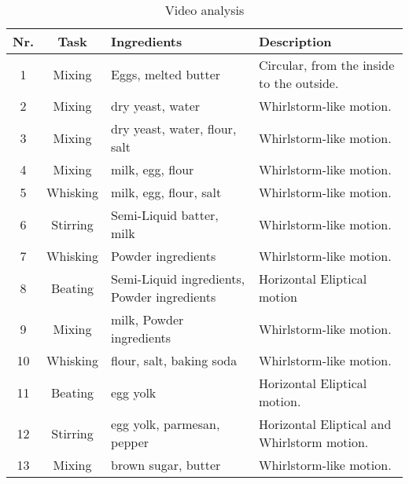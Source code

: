 \begin{table}[H]
    \centering
    \begin{tabular}{|c|c|p{}|p{}|}
        \hline
        \textbf{Nr.} & \textbf{Task} &  \textbf{Ingredients} & \textbf{Description} \\
        \hline
        1 & Mixing &  Eggs, melted butter & Circular, from the inside to the outside. \\
        \hline
        2 & Mixing &  dry yeast, water & Whirlstorm-like motion.\\
        \hline
        3 & Mixing &  dry yeast, water, flour, salt & Whirlstorm-like motion.\\
        \hline
        4 & Mixing &  milk, egg, flour & Whirlstorm-like motion.\\
        \hline
        5 & Whisking & milk, egg, flour, salt & Whirlstorm-like motion. \\
        \hline
        6 & Stirring & Semi-Liquid batter, milk & Whirlstorm-like motion. \\
        \hline
        7 & Whisking & Powder ingredients & Whirlstorm-like motion. \\
        \hline
        8 & Beating & Semi-Liquid ingredients, Powder ingredients & Horizontal Eliptical motion \\
        \hline
        9 & Mixing & milk, Powder ingredients & Whirlstorm-like motion. \\
        \hline
        10 & Whisking & flour, salt, baking soda & Whirlstorm-like motion. \\
        \hline
        11 & Beating & egg yolk & Horizontal Eliptical motion. \\
        \hline
        12 & Stirring & egg yolk, parmesan, pepper & Horizontal Eliptical and Whirlstorm motion. \\
        \hline
        13 & Mixing & brown sugar, butter & Whirlstorm-like motion. \\
        \hline
    \end{tabular}
    \caption{Video analysis}
    \label{tab:videoanalysis}
  \end{table}
